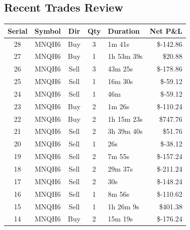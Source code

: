 \documentclass[11pt,a4paper]{article}
\begin{document}
\vspace{1em}
\subsection*{Recent Trades Review}
\begin{center}
\renewcommand{\arraystretch}{1.1}
\begin{tabular}{@{} c c c c l r @{}}
\toprule
\textbf{Serial} & \textbf{Symbol} & \textbf{Dir} & \textbf{Qty} & \textbf{Duration} & \textbf{Net P\&L} \\
\midrule
28 & MNQH6 & Buy & 3 & 1m 41s & \color{badred} \$-142.86 \\
27 & MNQH6 & Buy & 1 & 1h 53m 39s & \color{goodgreen} \$20.88 \\
26 & MNQH6 & Sell & 3 & 43m 25s & \color{badred} \$-178.86 \\
25 & MNQH6 & Sell & 1 & 16m 30s & \color{badred} \$-59.12 \\
24 & MNQH6 & Sell & 1 & 46m & \color{badred} \$-59.12 \\
23 & MNQH6 & Buy & 2 & 1m 26s & \color{badred} \$-110.24 \\
22 & MNQH6 & Buy & 2 & 1h 15m 23s & \color{goodgreen} \$747.76 \\
21 & MNQH6 & Sell & 2 & 3h 39m 40s & \color{goodgreen} \$51.76 \\
20 & MNQH6 & Sell & 1 & 26s & \color{badred} \$-38.12 \\
19 & MNQH6 & Sell & 2 & 7m 55s & \color{badred} \$-157.24 \\
18 & MNQH6 & Sell & 2 & 29m 37s & \color{badred} \$-211.24 \\
17 & MNQH6 & Sell & 2 & 30s & \color{badred} \$-148.24 \\
16 & MNQH6 & Sell & 1 & 8m 56s & \color{badred} \$-110.62 \\
15 & MNQH6 & Sell & 1 & 1h 26m 9s & \color{goodgreen} \$401.38 \\
14 & MNQH6 & Buy & 2 & 15m 19s & \color{badred} \$-176.24 \\
\bottomrule
\end{tabular}
\end{center}
\end{document}
